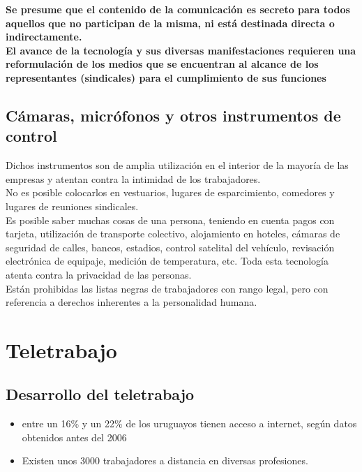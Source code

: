 \documentclass[spanish,12pt,a4paper,titlepage]{report}
\begin{document}
\textbf{Se presume que el contenido de la comunicación es secreto para todos aquellos que no participan de la misma, ni está destinada directa o indirectamente.}\\

\textbf{El avance de la tecnología y sus diversas manifestaciones requieren una reformulación de los medios que se encuentran al alcance de los representantes (sindicales) para el cumplimiento de sus funciones}

\subsection{Cámaras, micrófonos y otros instrumentos de control}

Dichos instrumentos son de amplia utilización en el interior de la mayoría de las empresas y atentan contra la intimidad de los trabajadores.\\

No es posible colocarlos en vestuarios, lugares de esparcimiento, comedores y lugares de reuniones sindicales.\\

Es posible saber muchas cosas de una persona, teniendo en cuenta pagos con tarjeta, utilización de transporte colectivo, alojamiento en hoteles, cámaras de seguridad de calles, bancos, estadios, control satelital del vehículo, revisación electrónica de equipaje, medición de temperatura, etc. Toda esta tecnología atenta contra la privacidad de las personas.\\

Están prohibidas las  listas negras de trabajadores con rango legal, pero con referencia a derechos inherentes a la personalidad humana.\\

\section{Teletrabajo}
\subsection{Desarrollo del teletrabajo}

\begin{itemize}
	\item entre un 16\% y  un 22\% de los uruguayos tienen acceso a internet, según datos obtenidos antes del 2006
	\item Existen unos 3000 trabajadores a distancia en diversas profesiones.
\end{itemize}
\end{document}
